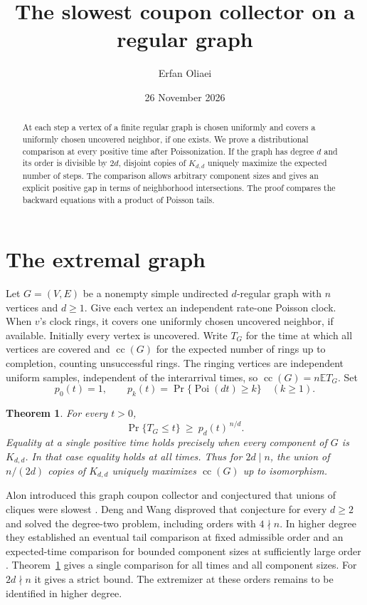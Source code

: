 \documentclass[11pt,a4paper]{article}
\title{The slowest coupon collector on a regular graph}
\author{Erfan Oliaei}
\date{26 November 2026}
\newtheorem{theorem}{Theorem}
\theoremstyle{remark}
\newcommand{\E}{\mathbb E}
\DeclareMathOperator{\Poi}{Poi}
\begin{document}
\maketitle
\begin{abstract}
At each step a vertex of a finite regular graph is chosen uniformly and covers a uniformly chosen uncovered neighbor, if one exists. We prove a distributional comparison at every positive time after Poissonization. If the graph has degree \(d\) and its order is divisible by \(2d\), disjoint copies of \(K_{d,d}\) uniquely maximize the expected number of steps. The comparison allows arbitrary component sizes and gives an explicit positive gap in terms of neighborhood intersections. The proof compares the backward equations with a product of Poisson tails.
\end{abstract}

\section{The extremal graph}

Let \(G=(V,E)\) be a nonempty simple undirected \(d\)-regular graph with \(n\) vertices and \(d\ge1\). Give each vertex an independent rate-one Poisson clock. When \(v\)'s clock rings, it covers one uniformly chosen uncovered neighbor, if available. Initially every vertex is uncovered. Write \(T_G\) for the time at which all vertices are covered and \(\operatorname{cc}(G)\) for the expected number of rings up to completion, counting unsuccessful rings. The ringing vertices are independent uniform samples, independent of the interarrival times, so \(\operatorname{cc}(G)=n\E T_G\). Set
\[
p_0(t)=1,\qquad p_k(t)=\Pr\{\Poi(dt)\ge k\}\quad(k\ge1).
\]

\begin{theorem}\label{main}
For every \(t>0\),
\[
                 \Pr\{T_G\le t\}\ \ge\ p_d(t)^{\,n/d}.
\]
Equality at a single positive time holds precisely when every component of \(G\) is \(K_{d,d}\). In that case equality holds at all times. Thus for \(2d\mid n\), the union of \(n/(2d)\) copies of \(K_{d,d}\) uniquely maximizes \(\operatorname{cc}(G)\) up to isomorphism.
\end{theorem}

Alon introduced this graph coupon collector and conjectured that unions of cliques were slowest \cite[Sec.~6]{Alon}. Deng and Wang \cite{DW} disproved that conjecture for every \(d\ge2\) and solved the degree-two problem, including orders with \(4\nmid n\). In higher degree they established an eventual tail comparison at fixed admissible order and an expected-time comparison for bounded component sizes at sufficiently large order \cite[Cor.~4.3 and Thm.~4.4]{DW}. Theorem~\ref{main} gives a single comparison for all times and all component sizes. For \(2d\nmid n\) it gives a strict bound. The extremizer at these orders remains to be identified in higher degree.
\end{document}
